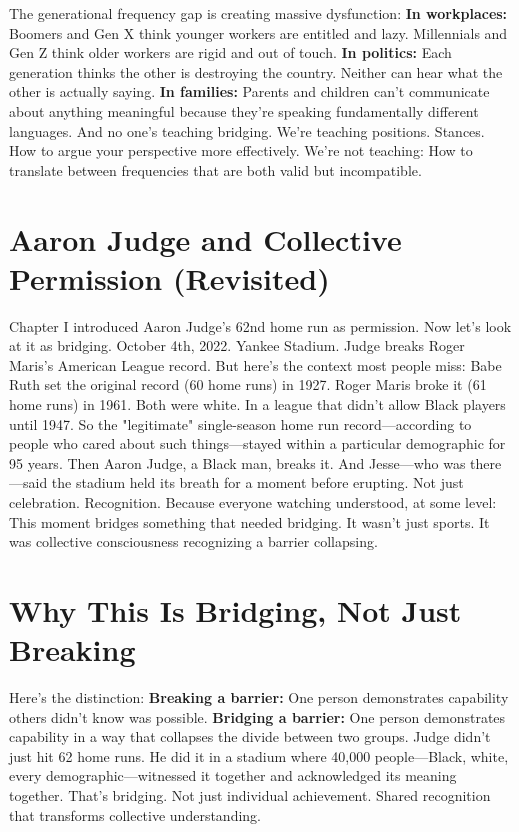 The generational frequency gap is creating massive dysfunction:
\textbf{In workplaces:} Boomers and Gen X think younger workers are entitled and lazy. Millennials and Gen Z think older workers are rigid and out of touch.
\textbf{In politics:} Each generation thinks the other is destroying the country. Neither can hear what the other is actually saying.
\textbf{In families:} Parents and children can't communicate about anything meaningful because they're speaking fundamentally different languages.
And no one's teaching bridging.
We're teaching positions. Stances. How to argue your perspective more effectively.
We're not teaching: How to translate between frequencies that are both valid but incompatible.

\section{Aaron Judge and Collective Permission (Revisited)}

Chapter I introduced Aaron Judge's 62nd home run as permission. Now let's look at it as bridging.
October 4th, 2022. Yankee Stadium. Judge breaks Roger Maris's American League record.
But here's the context most people miss:
Babe Ruth set the original record (60 home runs) in 1927. Roger Maris broke it (61 home runs) in 1961.
Both were white. In a league that didn't allow Black players until 1947.
So the "legitimate" single-season home run record—according to people who cared about such things—stayed within a particular demographic for 95 years.
Then Aaron Judge, a Black man, breaks it.
And Jesse—who was there—said the stadium held its breath for a moment before erupting.
Not just celebration. Recognition.
Because everyone watching understood, at some level: This moment bridges something that needed bridging.
It wasn't just sports. It was collective consciousness recognizing a barrier collapsing.

\section{Why This Is Bridging, Not Just Breaking}

Here's the distinction:
\textbf{Breaking a barrier:} One person demonstrates capability others didn't know was possible.
\textbf{Bridging a barrier:} One person demonstrates capability in a way that collapses the divide between two groups.
Judge didn't just hit 62 home runs. He did it in a stadium where 40,000 people—Black, white, every demographic—witnessed it together and acknowledged its meaning together.
That's bridging. Not just individual achievement. Shared recognition that transforms collective understanding.

